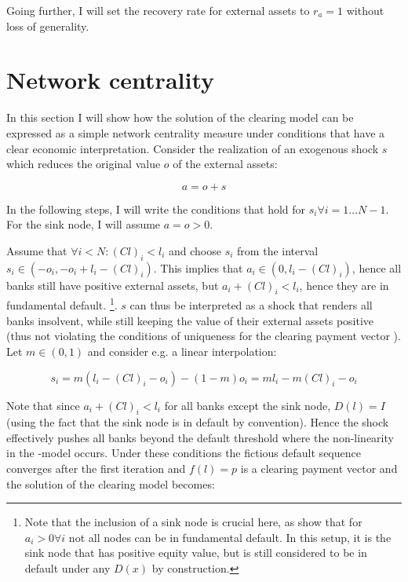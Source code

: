 \documentclass[authoryear,12pt]{elsarticle}
\begin{document}
Going further, I will set the recovery rate for external assets to $r_a=1$ without loss of generality.

\section{Network centrality}

In this section I will show how the solution of the clearing model can be expressed as a simple network centrality measure under conditions that have a clear economic interpretation. Consider the realization of an exogenous shock $s$ which reduces the original value $o$ of the external assets:

\begin{equation}
a = o + s
\end{equation}

In the following steps, I will write the conditions that hold for $s_i \forall i=1 \dots N-1$. For the sink node, I will assume $a=o>0$. 

Assume that $\forall i < N : (Cl)_i < l_i$ and choose $s_i$ from the interval $s_i \in (-o_i,-o_i + l_i - (Cl)_i)$. This implies that $a_i \in (0,l_i - (Cl)_i)$, hence all banks still have positive external assets, but $a_i + (Cl)_i < l_i$, hence they are in fundamental default. \footnote{Note that the inclusion of a sink node is crucial here, as \cite{Eisenberg2001} show that for $a_i>0 \forall i$ not all nodes can be in fundamental default. In this setup, it is the sink node that has positive equity value, but is still considered to be in default under any $D(x)$ by construction.}. $s$ can thus be interpreted as a shock that renders all banks insolvent, while still keeping the value of their external assets positive (thus not violating the conditions of uniqueness for the clearing payment vector \cite{Eisenberg2001}). Let $m\in(0,1)$ and consider e.g. a linear interpolation:

\begin{equation}
s_i=m(l_i-(Cl)_i-o_i)-(1-m)o_i=ml_i-m(Cl)_i-o_i
\end{equation}

Note that since $a_i + (Cl)_i < l_i$ for all banks except the sink node, $D(l)=I$ (using the fact that the sink node is in default by convention). Hence the shock effectively pushes all banks beyond the default threshold where the non-linearity in the \cite{Eisenberg2001}-model occurs. Under these conditions the fictious default sequence converges after the first iteration and $f(l) = p$ is a clearing payment vector and the solution of the clearing model becomes:
\end{document}
